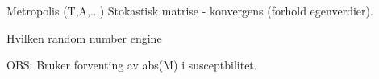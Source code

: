 
Metropolis (T,A,...)
	Stokastisk matrise  - konvergens (forhold egenverdier).
	
	Hvilken random number engine

	OBS: Bruker forventing av abs(M) i susceptbilitet. 

